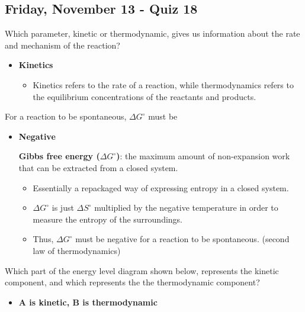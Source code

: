 \documentclass[12pt,a4paper]{article}
\begin{document}
\subsection{Friday, November 13 - Quiz 18}
\begin{enumerate}
    {\color{G-Moon}\item Which parameter, kinetic or thermodynamic, gives us information about the rate and mechanism of the reaction?}
        \begin{itemize}
            \item {\color{o-Sun}\textbf{Kinetics}} 
            \begin{itemize}
                \item Kinetics refers to the rate of a reaction, while thermodynamics refers to the equilibrium concentrations of the reactants and products.
            \end{itemize}
        \end{itemize}
    {\color{G-Moon}\item For a reaction to be spontaneous, \(\Delta G^\circ\) must be}
        \begin{itemize}
            \item {\color{o-Sun}\textbf{Negative}} 
            \begin{itemize}
                \textbf{Gibbs free energy (\(\Delta G^\circ\))}: the maximum amount of non-expansion work that can be extracted from a closed system.
                    \begin{itemize}
                        \item Essentially a repackaged way of expressing entropy in a closed system.
                        \item \(\Delta G^\circ\) is just \(\Delta S^\circ\) multiplied by the negative temperature in order to measure the entropy of the surroundings.
                        \item Thus, {\color{o-Sun}\(\Delta G^\circ\) must be {\color{neg}negative} for  a reaction to be spontaneous.} (second law of thermodynamics)
                    \end{itemize}
            \end{itemize}
        \end{itemize}
    {\color{G-Moon}\item Which part of the energy level diagram shown below, represents the kinetic component, and which represents the the thermodynamic component? }
        \begin{itemize}
            \item {\color{o-Sun}\textbf{A is kinetic, B is thermodynamic}} 

\end{itemize}
\end{enumerate}
\end{document}
